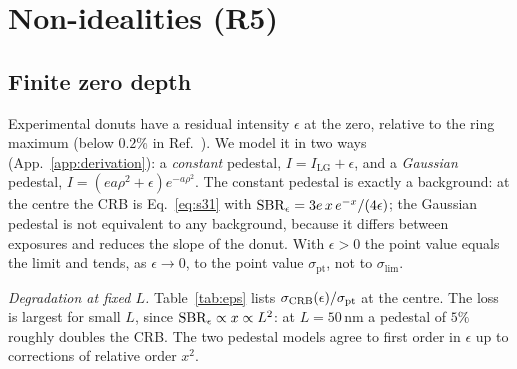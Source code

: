 \section{Non-idealities (R5)}\label{sec:nonideal}

\subsection{Finite zero depth}
Experimental donuts have a residual intensity $\epsilon$ at the zero, relative to the ring
maximum (below $0.2\%$ in Ref.~\cite{Balzarotti2017}). We model it
in two ways (App.~\ref{app:derivation}): a \emph{constant} pedestal, $I=I_{\mathrm{LG}}+\epsilon$,
and a \emph{Gaussian} pedestal, $I=(ea\rho^2+\epsilon)e^{-a\rho^2}$. The constant pedestal is
exactly a background: at the centre the CRB is Eq.~\eqref{eq:s31} with
$\mathrm{SBR}_\epsilon=3e\,x\,e^{-x}/(4\epsilon)$; the Gaussian pedestal is not equivalent to any
background, because it differs between exposures and reduces the slope of the donut. With $\epsilon>0$ the point value equals the limit and tends, as
$\epsilon\to0$, to the point value $\sigma_{\mathrm{pt}}$, not to $\sigma_{\lim}$.

\emph{Degradation at fixed $L$.} Table~\ref{tab:eps} lists
$\sigma_{\mathrm{CRB}}(\epsilon)/\sigma_{\mathrm{pt}}$ at the centre. The loss is largest for small $L$, since
$\mathrm{SBR}_\epsilon\propto x\propto L^2$: at $L=50$\,nm a pedestal of $5\%$ roughly doubles the CRB.
The two pedestal models agree to first order in $\epsilon$ up to corrections of relative order
$x^2$.

